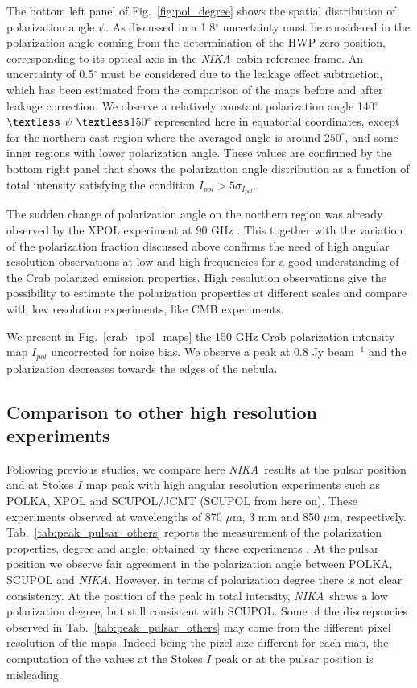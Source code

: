 \documentclass[twocolumn,traditabstract]{aa}
\def\NIKA{\textit{NIKA}}
\begin{document}
The bottom left panel of Fig.~\ref{fig:pol_degree} shows the spatial distribution of polarization angle
$\psi$. As discussed in \cite{ritacco2017} a 1.8$^{\circ}$ uncertainty must be considered in the polarization angle coming from the determination of the HWP zero position, corresponding to its optical axis in the \NIKA\ cabin reference frame. An uncertainty of 0.5$^{\circ}$ must be considered due to the leakage effect subtraction, which has been estimated from the comparison of the maps before and after leakage correction. We observe a relatively constant polarization
angle 140$^{\circ}$ $\textless$ $\psi$ $\textless$150$^{\circ}$ represented here in equatorial coordinates, except
for the northern-east region where the averaged angle is around $250^{\circ}$, and
some inner regions with lower polarization angle.  These values are confirmed by
the bottom right panel that shows the polarization angle distribution as a
function of total intensity satisfying the condition $I_{pol} > 5\sigma_{I_{pol}}$.

The sudden change of polarization angle on the northern region was already
observed by the XPOL experiment at 90 GHz \citep{aumont2010}.  This together
with the variation of the polarization fraction discussed above confirms the
need of high angular resolution observations at low and high frequencies for a
good understanding of the Crab polarized emission properties.
High resolution observations give the possibility to estimate the polarization properties at different scales and compare with low resolution experiments, like CMB experiments.

We present in Fig.~\ref{crab_ipol_maps} the 150 GHz Crab polarization intensity
map $I_{pol}$ uncorrected for noise bias. We observe a peak at 0.8 Jy beam$^{-1}$ and the polarization
decreases towards the edges of the nebula.

\subsection{Comparison to other high resolution experiments}
Following previous studies, we compare here \NIKA\ results at the pulsar position and at Stokes $I$ map peak with high angular resolution experiments such as POLKA, XPOL and SCUPOL/JCMT (SCUPOL from here on). These experiments observed at wavelengths of 870 $\mu$m, 3 mm and 850 $\mu$m, respectively.
Tab.~\ref{tab:peak_pulsar_others} reports the measurement of the polarization properties, degree and angle, obtained by these experiments \citep{2014PASP..126.1027W}. 
At the pulsar position we observe fair agreement in the polarization angle between POLKA, SCUPOL and \NIKA. However, in terms of polarization degree there is not clear consistency. At the position of the peak in total intensity, \NIKA\ shows a low polarization degree, but still consistent with SCUPOL. Some of the discrepancies observed in Tab.~\ref{tab:peak_pulsar_others} may come from the different pixel resolution of the maps. Indeed being the pizel size different for each map, the computation of the values at the Stokes $I$ peak or at the pulsar position is misleading.
\end{document}

